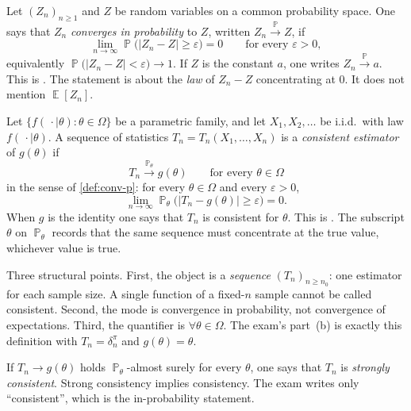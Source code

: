 \documentclass[11pt,a4paper]{article}
\DeclareMathOperator{\E}{\mathbb{E}}
\DeclareMathOperator{\Pbb}{\mathbb{P}}
\begin{document}
\begin{definition}
\label{def:conv-p}
Let \( (Z_n)_{n\ge 1} \) and \( Z \) be random variables on a common probability space. One says that \( Z_n \) \emph{converges in probability} to \( Z \), written \( Z_n\xrightarrow{\Pbb}Z \), if
\[
\lim_{n\to\infty}\Pbb\bigl(|Z_n-Z|\ge\varepsilon\bigr)
=
0
\qquad\text{for every }\varepsilon>0,
\]
equivalently \( \Pbb\bigl(|Z_n-Z|<\varepsilon\bigr)\to 1 \). If \( Z \) is the constant \( a \), one writes \( Z_n\xrightarrow{\Pbb}a \). This is \citep[Definition~5.1.1]{hogg2019}. The statement is about the \emph{law} of \( Z_n-Z \) concentrating at \( 0 \). It does not mention \( \E[Z_n] \).
\end{definition}

\begin{definition}[Consistency]
\label{def:consistency}
Let \( \{f(\,\cdot\mid\theta):\theta\in\Omega\} \) be a parametric family, and let \( X_1,X_2,\dots \) be i.i.d.\ with law \( f(\,\cdot\mid\theta) \). A sequence of statistics \( T_n=T_n(X_1,\dots,X_n) \) is a \emph{consistent estimator} of \( g(\theta) \) if
\[
T_n
\xrightarrow{\Pbb_\theta}
g(\theta)
\qquad\text{for every }\theta\in\Omega
\]
in the sense of \cref{def:conv-p}: for every \( \theta\in\Omega \) and every \( \varepsilon>0 \),
\[
\lim_{n\to\infty}
\Pbb_\theta\bigl(\bigl|T_n-g(\theta)\bigr|\ge\varepsilon\bigr)
=
0.
\]
When \( g \) is the identity one says that \( T_n \) is consistent for \( \theta \). This is \citep[Definition~5.1.2]{hogg2019}. The subscript \( \theta \) on \( \Pbb_\theta \) records that the same sequence must concentrate at the true value, whichever value is true.

Three structural points. First, the object is a \emph{sequence} \( (T_n)_{n\ge n_0} \): one estimator for each sample size. A single function of a fixed-\( n \) sample cannot be called consistent. Second, the mode is convergence in probability, not convergence of expectations. Third, the quantifier is \( \forall\theta\in\Omega \). The exam's part~(b) is exactly this definition with \( T_n=\delta_n^{\pi} \) and \( g(\theta)=\theta \).

If \( T_n\to g(\theta) \) holds \( \Pbb_\theta \)-almost surely for every \( \theta \), one says that \( T_n \) is \emph{strongly consistent}. Strong consistency implies consistency. The exam writes only ``consistent'', which is the in-probability statement.
\end{definition}
\end{document}
